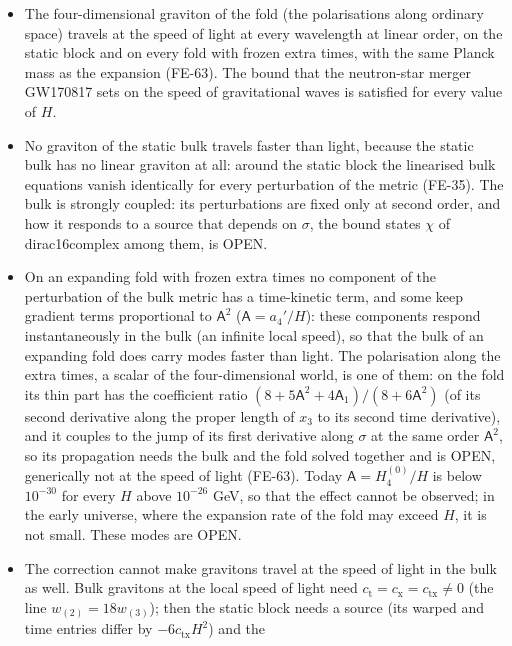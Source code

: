 \documentclass[
  10pt,
]{article}
\providecommand{\tightlist}{%
  \setlength{\itemsep}{0pt}\setlength{\parskip}{0pt}}
\begin{document}
\begin{itemize}
\tightlist
\item
  The four-dimensional graviton of the fold (the polarisations along
  ordinary space) travels at the speed of light at every wavelength at
  linear order, on the static block and on every fold with frozen extra
  times, with the same Planck mass as the expansion (FE-63). The bound
  that the neutron-star merger GW170817 sets on the speed of
  gravitational waves is satisfied for every value of \(H\).
\item
  No graviton of the static bulk travels faster than light, because the
  static bulk has no linear graviton at all: around the static block the
  linearised bulk equations vanish identically for every perturbation of
  the metric (FE-35). The bulk is strongly coupled: its perturbations
  are fixed only at second order, and how it responds to a source that
  depends on \(\sigma\), the bound states \(\chi\) of dirac16complex
  among them, is OPEN.
\item
  On an expanding fold with frozen extra times no component of the
  perturbation of the bulk metric has a time-kinetic term, and some keep
  gradient terms proportional to \(\mathsf{A}^2\)
  (\(\mathsf{A} = a_4'/H\)): these components respond instantaneously in
  the bulk (an infinite local speed), so that the bulk of an expanding
  fold does carry modes faster than light. The polarisation along the
  extra times, a scalar of the four-dimensional world, is one of them:
  on the fold its thin part has the coefficient ratio
  \((8 + 5\mathsf{A}^2 + 4\mathsf{A}_1)/(8 + 6\mathsf{A}^2)\) (of its
  second derivative along the proper length of \(x_3\) to its second
  time derivative), and it couples to the jump of its first derivative
  along \(\sigma\) at the same order \(\mathsf{A}^2\), so its
  propagation needs the bulk and the fold solved together and is OPEN,
  generically not at the speed of light (FE-63). Today
  \(\mathsf{A} = H_4^{(0)}/H\) is below \(10^{-30}\) for every \(H\)
  above \(10^{-26}\) GeV, so that the effect cannot be observed; in the
  early universe, where the expansion rate of the fold may exceed \(H\),
  it is not small. These modes are OPEN.
\item
  The correction cannot make gravitons travel at the speed of light in
  the bulk as well. Bulk gravitons at the local speed of light need
  \(c_{\mathrm{t}} = c_{\mathrm{x}} = c_{\mathrm{tx}} \ne 0\) (the line
  \(w_{(2)} = 18w_{(3)}\)); then the static block needs a source (its
  warped and time entries differ by \(-6c_{\mathrm{tx}}H^2\)) and the

\end{itemize}
\end{document}
